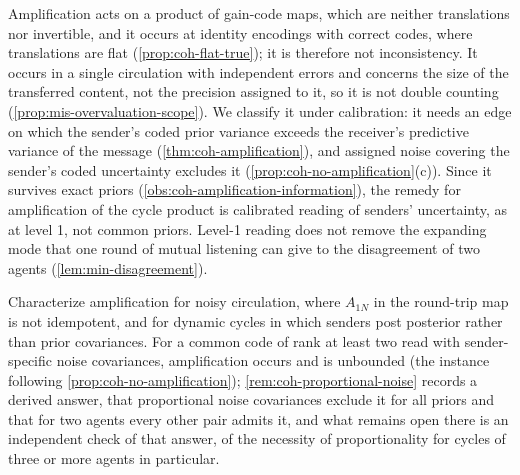 \begin{remark}\label{rem:coh-amplification-class}
Amplification acts on a product of gain-code maps, which are neither translations nor invertible, and it occurs at identity encodings with correct codes, where translations are flat (\cref{prop:coh-flat-true}); it is therefore not inconsistency. It occurs in a single circulation with independent errors and concerns the size of the transferred content, not the precision assigned to it, so it is not double counting (\cref{prop:mis-overvaluation-scope}). We classify it under calibration: it needs an edge on which the sender's coded prior variance exceeds the receiver's predictive variance of the message (\cref{thm:coh-amplification}), and assigned noise covering the sender's coded uncertainty excludes it (\cref{prop:coh-no-amplification}(c)). Since it survives exact priors (\cref{obs:coh-amplification-information}), the remedy for amplification of the cycle product is calibrated reading of senders' uncertainty, as at level 1, not common priors. Level-1 reading does not remove the expanding mode that one round of mutual listening can give to the disagreement of two agents (\cref{lem:min-disagreement}).
\end{remark}

\begin{openproblem}\label{open:coh-amplification-noisy}
Characterize amplification for noisy circulation, where $A_{1N}$ in the round-trip map is not idempotent, and for dynamic cycles in which senders post posterior rather than prior covariances. For a common code of rank at least two read with sender-specific noise covariances, amplification occurs and is unbounded (the instance following \cref{prop:coh-no-amplification}); \cref{rem:coh-proportional-noise} records a derived answer, that proportional noise covariances exclude it for all priors and that for two agents every other pair admits it, and what remains open there is an independent check of that answer, of the necessity of proportionality for cycles of three or more agents in particular.
\end{openproblem}

